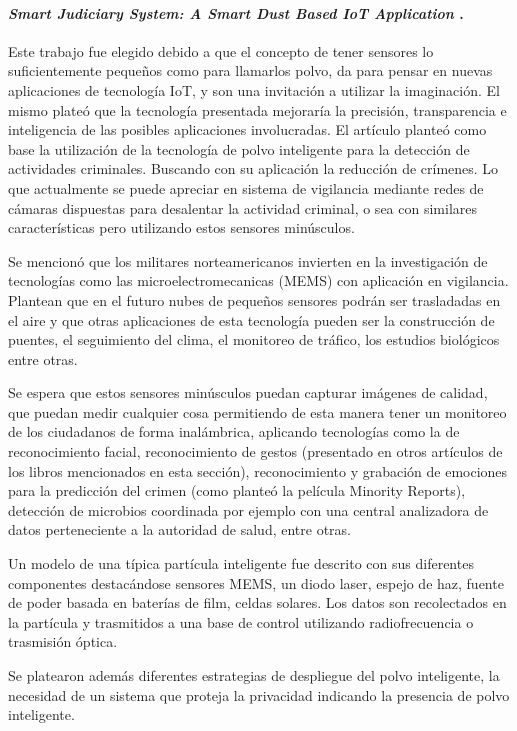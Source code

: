 \paragraph{
    \textbf{\emph{Smart Judiciary System: A Smart Dust
    Based IoT Application}
    }
    \cite[pág. 128]{somani_emerging_2019}.
}


Este trabajo fue elegido debido a que el concepto de tener sensores lo suficientemente pequeños como para llamarlos polvo,
da para pensar en nuevas aplicaciones de tecnología IoT, y son una invitación a utilizar la imaginación.
El mismo plateó que la tecnología presentada mejoraría la precisión, transparencia e inteligencia de las posibles aplicaciones involucradas. 
El artículo planteó como base la utilización de la tecnología de polvo inteligente para la detección de actividades criminales. 
Buscando con su aplicación la reducción de crímenes. Lo que actualmente se puede apreciar en sistema de vigilancia mediante redes de cámaras dispuestas 
para desalentar la actividad criminal, o sea con similares características pero utilizando estos sensores minúsculos.

Se mencionó que los militares norteamericanos invierten en la investigación de tecnologías como las microelectromecanicas (MEMS) 
con aplicación en vigilancia. Plantean que en el futuro nubes de pequeños sensores podrán ser trasladadas en el aire y que otras aplicaciones de esta tecnología pueden ser la construcción de puentes, el seguimiento del clima, el monitoreo de tráfico, los estudios biológicos entre otras. 

Se espera que estos sensores minúsculos puedan capturar imágenes de calidad, que puedan medir cualquier cosa permitiendo de esta manera tener un monitoreo de los ciudadanos de forma inalámbrica, aplicando tecnologías como la de reconocimiento facial, reconocimiento de gestos (presentado en otros artículos de los libros mencionados en esta sección), reconocimiento y grabación de emociones para la predicción del crimen (como planteó la película Minority Reports), detección de microbios coordinada por ejemplo con una central analizadora de datos perteneciente a la autoridad de salud, entre otras.

Un modelo de una típica partícula inteligente fue descrito con sus diferentes componentes destacándose sensores MEMS, un diodo laser, espejo de haz, fuente de poder basada en baterías de film, celdas solares. Los datos son recolectados en  la partícula y trasmitidos a una base de control utilizando radiofrecuencia o trasmisión óptica. 

Se platearon además diferentes estrategias de despliegue del polvo inteligente, la necesidad de un sistema que proteja la privacidad indicando la presencia de polvo inteligente.











